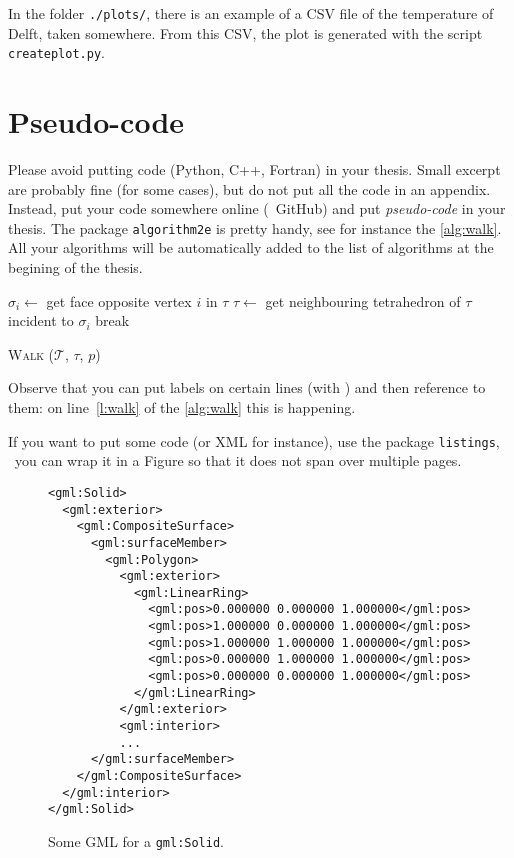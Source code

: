 In the folder \texttt{./plots/}, there is an example of a CSV file of the temperature of Delft, taken somewhere.
From this CSV, the plot is generated with the script \texttt{createplot.py}.


%
\section{Pseudo-code}%
\label{sec:code}

Please avoid putting code (Python, C++, Fortran) in your thesis.
Small excerpt are probably fine (for some cases), but do not put all the code in an appendix.
Instead, put your code somewhere online (\eg\ GitHub) and put \emph{pseudo-code} in your thesis.
The package \texttt{algorithm2e} is pretty handy, see for instance the \autoref{alg:walk}.
All your algorithms will be automatically added to the list of algorithms at the begining of the thesis.
\begin{algorithm}
  \BlankLine
  {
    {
      $\sigma_i \leftarrow$ get face opposite vertex $i$ in $\tau$\;
      {
        $\tau \leftarrow$ get neighbouring tetrahedron of $\tau$ incident to $\sigma_i$\;
        break\;
      }
    }  
    {
    }
  }
  \caption[W\textsc{alk}]{W\textsc{alk} ($\mathcal{T}$, $\tau$, $p$)}%
\label{alg:walk}
\end{algorithm}
Observe that you can put labels on certain lines (with \texttt{\nllabel{}}) and then reference to them: on line~\ref{l:walk} of the \autoref{alg:walk} this is happening.

If you want to put some code (or XML for instance), use the package \texttt{listings}, \eg\ you can wrap it in a Figure so that it does not span over multiple pages.
\begin{figure}
\begin{footnotesize}
\begin{lstlisting}
<gml:Solid>
  <gml:exterior>
    <gml:CompositeSurface>
      <gml:surfaceMember>
        <gml:Polygon>
          <gml:exterior>
            <gml:LinearRing>
              <gml:pos>0.000000 0.000000 1.000000</gml:pos>
              <gml:pos>1.000000 0.000000 1.000000</gml:pos>
              <gml:pos>1.000000 1.000000 1.000000</gml:pos>
              <gml:pos>0.000000 1.000000 1.000000</gml:pos>
              <gml:pos>0.000000 0.000000 1.000000</gml:pos>
            </gml:LinearRing>
          </gml:exterior>
          <gml:interior>
          ...
      </gml:surfaceMember>
    </gml:CompositeSurface>
  </gml:interior>
</gml:Solid>
\end{lstlisting}
\end{footnotesize}
\caption{Some GML for a \texttt{gml:Solid}.}%
\label{fig:codegml}
\end{figure}

